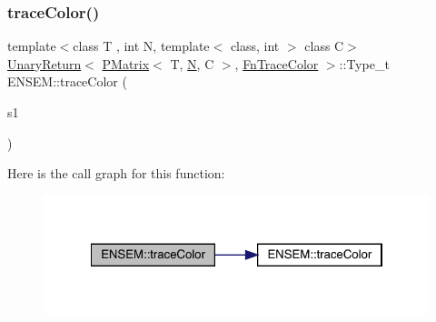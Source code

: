 \subsubsection{\texorpdfstring{traceColor()}{traceColor()}}
{\footnotesize\ttfamily template$<$class T , int N, template$<$ class, int $>$ class C$>$ \\
\mbox{\hyperlink{structENSEM_1_1UnaryReturn}{Unary\+Return}}$<$ \mbox{\hyperlink{classENSEM_1_1PMatrix}{P\+Matrix}}$<$ T, \mbox{\hyperlink{adat__devel_2lib_2hadron_2operator__name__util_8cc_a7722c8ecbb62d99aee7ce68b1752f337}{N}}, C $>$, \mbox{\hyperlink{structENSEM_1_1FnTraceColor}{Fn\+Trace\+Color}} $>$\+::Type\+\_\+t E\+N\+S\+E\+M\+::trace\+Color (\begin{DoxyParamCaption}\item[{const \mbox{\hyperlink{classENSEM_1_1PMatrix}{P\+Matrix}}$<$ T, \mbox{\hyperlink{adat__devel_2lib_2hadron_2operator__name__util_8cc_a7722c8ecbb62d99aee7ce68b1752f337}{N}}, C $>$ \&}]{s1 }\end{DoxyParamCaption})\hspace{0.3cm}{\ttfamily [inline]}}

Here is the call graph for this function\+:\nopagebreak
\begin{figure}[H]
\begin{center}
\leavevmode
\includegraphics[width=322pt]{df/d0a/group__primmatrix_ga1d05c45afa351dba712d9d083a013d41_cgraph}
\end{center}
\end{figure}
\mbox{\label{group__primmatrix_ga017dba078c2a41f5ca2a8d2b934b20aa}} 
